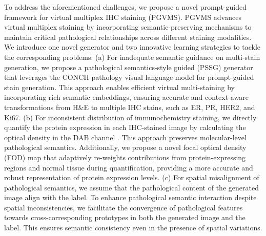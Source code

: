 \documentclass[journal,twoside,web]{ieeecolor}
\begin{document}


To address the aforementioned challenges, we propose a novel prompt-guided framework for virtual multiplex IHC staining (PGVMS). PGVMS advances virtual multiplex staining by incorporating semantic-preserving mechanisms to maintain critical pathological relationships across different staining modalities. We introduce one novel generator and two innovative learning strategies to tackle the corresponding problems:
(a) For inadequate semantic guidance on multi-stain generation, we propose a pathological semantics-style guided (PSSG) generator  that leverages the CONCH pathology visual language model for prompt-guided stain generation. This approach enables efficient virtual multi-staining by incorporating rich semantic embeddings, ensuring accurate and context-aware transformations from H\&E to multiple IHC stains, such as ER, PR, HER2, and Ki67.
(b) For inconsistent distribution of immunochemistry staining, we directly quantify the protein expression in each IHC-stained image by calculating the optical density in the DAB channel \cite{harms2023multiplex}. This approach preserves molecular-level pathological semantics. {Additionally, we propose a novel focal optical density (FOD) map that adaptively re-weights contributions from protein-expressing regions and normal tissue during quantification, providing a more accurate and robust representation of protein expression levels.}
(c) For spatial misalignment of pathological semantics, we assume that the pathological content of the generated image align with the label. To enhance pathological semantic interaction despite spatial inconsistencies, we facilitate the convergence of pathological features towards cross-corresponding prototypes in both the generated image and the label. This ensures semantic consistency even in the presence of spatial variations.
\end{document}

